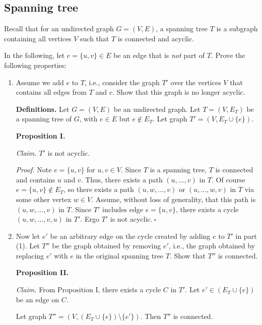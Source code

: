 \subsection{Spanning tree}

Recall that for an undirected graph $G = (V,E)$, a spanning tree $T$ is a subgraph containing all vertices $V$ such that $T$ is connected and acyclic. 

In the following, let $e=\{u,v\}\in E$ be an edge that is \emph{not} part of $T$.
Prove the following properties:

\begin{enumerate}
\item Assume we add $e$ to $T$, i.e., consider the graph $T'$ over the vertices $V$ that contains all edges from $T$ and $e$. Show that this graph is no longer acyclic.
\begin{solution}

\textbf{Definitions. }Let $G=(V,E)$ be an undirected graph. Let $T=(V,E_T)$ be a spanning tree of $G$, with $e\in E$ but $e\notin E_T$. Let graph $T'=(V,E_T\cup\{e\})$. 

\textbf{Proposition I. }

\textit{Claim. }$T'$ is not acyclic.

\textit{Proof. }Note $e=\{u,v\}$ for $u,v\in V$. Since $T$ is a spanning tree, $T$ is connected and contains $u$ and $v$. Thus, there exists a path $(u,\dots,v)$ in $T$. Of course $e=\{u,v\}\notin E_T$, so there exists a path $(u,w,\dots,v)$ or $(u,\dots,w,v)$ in $T$ via some other vertex $w\in V$. Assume, without loss of generality, that this path is $(u,w,\dots,v)$ in $T$. Since $T'$ includes edge $e=\{u,v\}$, there exists a cycle $(u,w,\dots,v,u)$ in $T'$. Ergo $T'$ is not acyclic.$~\square$
\end{solution}
\item Now let $e'$ be an arbitrary edge on the cycle created by adding $e$ to $T'$ in part (1). Let $T''$ be the graph obtained by removing $e'$, i.e., the graph obtained by replacing $e'$ with $e$ in the original spanning tree $T$. Show that $T''$ is connected.
\begin{solution}

\textbf{Proposition II. }

\textit{Claim. }From Proposition I, there exists a cycle $C$ in $T'$. Let $e'\in(E_T\cup\{e\})$ be an edge on $C$.

Let graph $T''=(V,(E_T\cup\{e\})\setminus\{e'\})$. Then $T''$ is connected.


\end{solution}
\end{enumerate}
